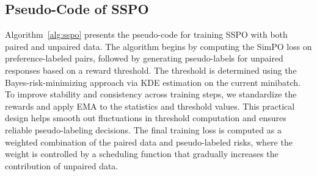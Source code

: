 \documentclass{article} %
\begin{document}
\subsection{Pseudo-Code of SSPO}
\label{appendix:pseudo-code}
Algorithm~\ref{alg:sspo} presents the pseudo-code for training SSPO with both paired and unpaired data. The algorithm begins by computing the SimPO loss on preference-labeled pairs, followed by generating pseudo-labels for unpaired responses based on a reward threshold. The threshold is determined using the Bayes-risk-minimizing approach via KDE estimation on the current minibatch. To improve stability and consistency across training steps, we standardize the rewards and apply EMA to the statistics and threshold values. This practical design helps smooth out fluctuations in threshold computation and ensures reliable pseudo-labeling decisions. The final training loss is computed as a weighted combination of the paired data and pseudo-labeled risks, where the weight is controlled by a scheduling function that gradually increases the contribution of unpaired data.
\end{document}
